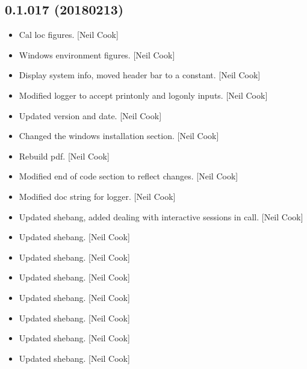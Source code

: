 \documentclass[a4paper,10pt,english]{report}
\begin{document}
\subsection{0.1.017 (2018\sphinxhyphen{}02\sphinxhyphen{}13)}
\label{\detokenize{misc/changelog:id506}}\begin{itemize}
\item {} 
Cal loc figures. {[}Neil Cook{]}

\item {} 
Windows environment figures. {[}Neil Cook{]}

\item {} 
Display system info, moved header bar to a constant. {[}Neil Cook{]}

\item {} 
Modified logger to accept printonly and logonly inputs. {[}Neil Cook{]}

\item {} 
Updated version and date. {[}Neil Cook{]}

\item {} 
Changed the windows installation section. {[}Neil Cook{]}

\item {} 
Rebuild pdf. {[}Neil Cook{]}

\item {} 
Modified end of code section to reflect changes. {[}Neil Cook{]}

\item {} 
Modified doc string for logger. {[}Neil Cook{]}

\item {} 
Updated shebang, added  dealing with interactive sessions
in  call. {[}Neil Cook{]}

\item {} 
Updated shebang. {[}Neil Cook{]}

\item {} 
Updated shebang. {[}Neil Cook{]}

\item {} 
Updated shebang. {[}Neil Cook{]}

\item {} 
Updated shebang. {[}Neil Cook{]}

\item {} 
Updated shebang. {[}Neil Cook{]}

\item {} 
Updated shebang. {[}Neil Cook{]}

\item {} 
Updated shebang. {[}Neil Cook{]}


\end{itemize}
\end{document}
